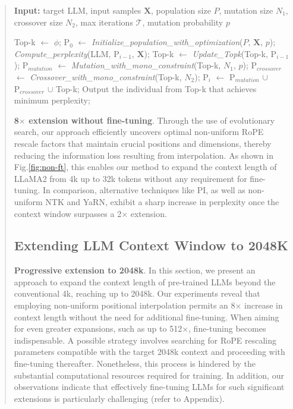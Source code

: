 \begin{abstract}
\begin{algorithm}[t]
	\small
	\caption{The search algorithm}
	\textbf{Input:} target LLM, input samples $\mathbf{X}$, population size $P$, mutation size $N_1$, crossover size $N_2$, max iterations $\mathcal{T}$, mutation probability $p$\\

	\begin{algorithmic}[1]
		\label{alg:search}
		\STATE Top-k $\leftarrow$ $\phi$;	
		\STATE $\text{P}_0$ $\leftarrow$ \textit{Initialize\_population\_with\_optimization}($P$, $\mathbf{X}$, $p$); 
		\STATE \textit{Compute\_perplexity}(LLM, $\text{P}_{i-1}$, $\mathbf{X}$);
		\STATE Top-k $\leftarrow$ \textit{Update\_Topk}(Top-k, $\text{P}_{i-1}$);
		\STATE $\text{P}_{mutation}$ $\leftarrow$ \textit{Mutation\_with\_mono\_constraint}(Top-k, $N_1$, $p$); 
		\STATE $\text{P}_{crossover}$ $\leftarrow$ \textit{Crossover\_with\_mono\_constraint}(Top-k, $N_2$);
		\STATE $\text{P}_i$ $\leftarrow$ $\text{P}_{mutation}$ $\cup$ $\text{P}_{crossover}$ $\cup$ Top-k;
		\ENDFOR
		\STATE Output the individual from Top-k that achieves minimum perplexity;
	\end{algorithmic}
\end{algorithm}

\textbf{8$\times$ extension without fine-tuning}. Through the use of evolutionary search, our approach efficiently uncovers optimal non-uniform RoPE rescale factors that maintain crucial positions and dimensions, thereby reducing the information loss resulting from interpolation. As shown in Fig.\ref{fig:non-ft}, this enables our method to expand the context length of LLaMA2 from 4k up to 32k tokens without any requirement for fine-tuning. In comparison, alternative techniques like PI, as well as non-uniform NTK and YaRN, exhibit a sharp increase in perplexity once the context window surpasses a 2$\times$ extension.

\subsection{Extending LLM Context Window to 2048K}
\label{sec:extendto2048k}

\textbf{Progressive extension to 2048k}. In this section, we present an approach to expand the context length of pre-trained LLMs beyond the conventional 4k, reaching up to 2048k. Our experiments reveal that employing non-uniform positional interpolation permits an 8$\times$ increase in context length without the need for additional fine-tuning. When aiming for even greater expansions, such as up to 512$\times$, fine-tuning becomes indispensable. A possible strategy involves searching for RoPE rescaling parameters compatible with the target 2048k context and proceeding with fine-tuning thereafter. Nonetheless, this process is hindered by the substantial computational resources required for training. In addition, our observations indicate that effectively fine-tuning LLMs for such significant extensions is particularly challenging (refer to Appendix).


\end{abstract}
